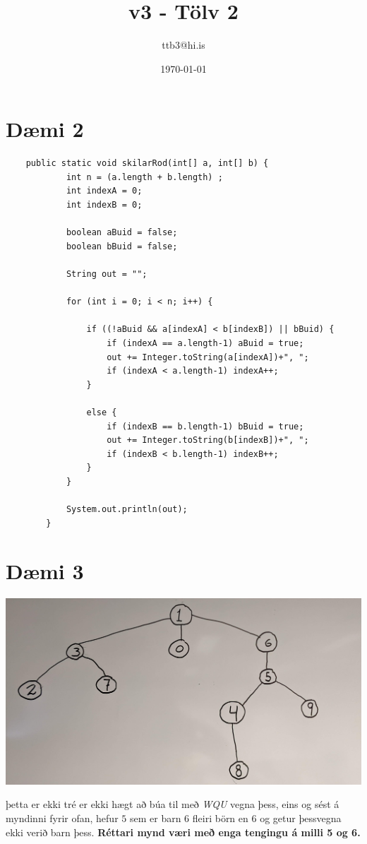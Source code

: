 \documentclass{article}
\title{v3 - Tölv 2}
\author{ttb3@hi.is}
\date{\today}
\begin{document}
\maketitle


\section*{Dæmi 2}

\begin{lstlisting}
    public static void skilarRod(int[] a, int[] b) {
            int n = (a.length + b.length) ;
            int indexA = 0;
            int indexB = 0;
    
            boolean aBuid = false;
            boolean bBuid = false;
    
            String out = "";
    
            for (int i = 0; i < n; i++) {
                
                if ((!aBuid && a[indexA] < b[indexB]) || bBuid) {
                    if (indexA == a.length-1) aBuid = true;
                    out += Integer.toString(a[indexA])+", ";
                    if (indexA < a.length-1) indexA++;
                }
    
                else {
                    if (indexB == b.length-1) bBuid = true;
                    out += Integer.toString(b[indexB])+", ";
                    if (indexB < b.length-1) indexB++;
                }
            }
            
            System.out.println(out);
        }
\end{lstlisting}

\section*{Dæmi 3}
\begin{center}
    \includegraphics[scale=0.1]{imgs/tree_159.jpg}
\end{center}
þetta er ekki tré er ekki hægt að búa til með \emph{WQU} vegna þess, 
eins og sést á myndinni fyrir ofan, 
hefur $5$ sem er barn $6$ fleiri börn en $6$ og getur þessvegna ekki verið barn þess. 
\textbf{Réttari mynd væri með enga tengingu á milli 5 og 6.}
\end{document}

